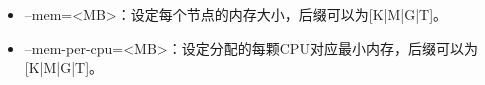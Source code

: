 \begin{itemize}
%
%
%
%
%
%
%
%
   \item --mem=<MB>：设定每个节点的内存大小，后缀可以为[K|M|G|T]。
   \item --mem-per-cpu=<MB>：设定分配的每颗CPU对应最小内存，后缀可以为[K|M|G|T]。


\end{itemize}
